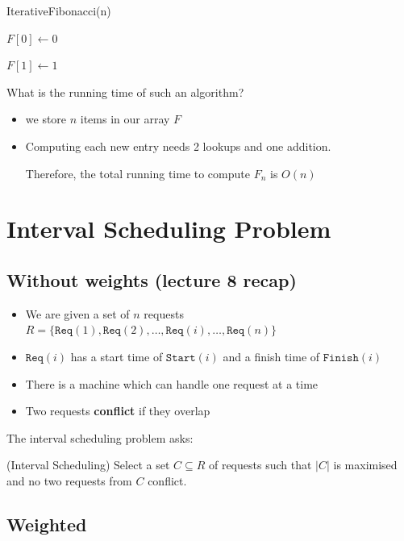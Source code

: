 \documentclass{article}
\begin{document}
\begin{algorithm}
  \caption{IterativeFibonacci(n)}
  $F[0] \leftarrow 0$

  $F[1] \leftarrow 1$

\end{algorithm}

What is the running time of such an algorithm?

\begin{itemize}
  \item we store $n$ items in our array $F$
  \item Computing each new entry needs 2 lookups and one addition.

        Therefore, the total running time to compute $F_{n}$ is $O(n)$
\end{itemize}

\section{Interval Scheduling Problem}

\subsection{Without weights (lecture 8 recap)}

\begin{itemize}
  \item We are given a set of $n$ requests $R = \{ \texttt{Req}(1), \texttt{Req}(2), \ldots, \texttt{Req}(i), \ldots, \texttt{Req}(n)\} $
  \item $\texttt{Req}(i)$ has a start time of $\texttt{Start} (i)$ and a finish time of $\texttt{Finish} (i)$
  \item There is a machine which can handle one request at a time
  \item Two requests \textbf{conflict} if they overlap
\end{itemize}

The interval scheduling problem asks:

\begin{problem}(Interval Scheduling)
 Select a set $C \subseteq R$ of requests such that $|C|$ is maximised and no two requests from $C$ conflict.
\end{problem}

\subsection{Weighted}
\end{document}
